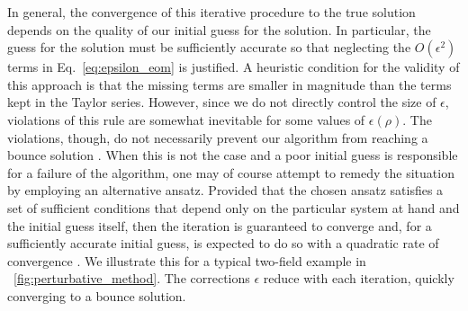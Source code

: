 \documentclass[final,3p,11pt,pdflatex]{elsarticle}
\newcommand{\figref}[1]{\figurename~\ref{#1}}
\renewcommand{\refeq}[1]{Eq.~\ref{#1}}
\begin{document}
In general, the convergence of this iterative procedure to the true solution
depends on the quality of our initial guess for the solution.  In particular,
the guess for the solution must be sufficiently accurate so that neglecting
the $O(\epsilon^2)$ terms in \refeq{eq:epsilon_eom} is justified.
A heuristic condition for the validity of this approach is that the missing
terms are smaller in magnitude than the terms kept in the Taylor series.
However, since we do not directly control the size of $\epsilon$, violations
of this rule are somewhat inevitable for some values of $\epsilon(\rho)$.
The violations, though, do not necessarily prevent our algorithm from reaching
a bounce solution \cite{Akula:2016gpl}.  When this is not the case and
a poor initial guess is responsible for a failure of the algorithm, one may
of course attempt to remedy the situation by employing an alternative ansatz.
Provided that the chosen ansatz satisfies a set of
sufficient conditions that depend only on the particular system at hand
and the initial guess itself, then the iteration is guaranteed to converge
and, for a sufficiently accurate initial guess, is expected
to do so with a quadratic rate of convergence \cite{NKtheorem}.
We illustrate this for a typical two-field example in
\figref{fig:perturbative_method}.  The corrections $\epsilon$ reduce with each
iteration, quickly converging to a bounce solution.
\end{document}

